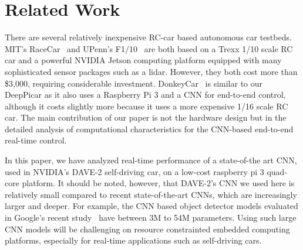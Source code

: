 \section{Related Work}\label{sec:related}


There are several relatively inexpensive RC-car based autonomous car
testbeds. MIT's RaceCar~\cite{shin2017project} and UPenn's
F1$/$10~\cite{upennf1tenth} are both based on a Trexx 1/10 scale RC
car and a powerful NVIDIA Jetson computing platform equipped with many
sophisticated sensor packages such as a lidar. However, they both cost
more than \$3,000, requiring considerable
investment. DonkeyCar~\cite{donkeycar} is similar to our DeepPicar as
it also uses a Raspberry Pi 3 and a CNN for end-to-end control,
although it costs slightly more because it uses a more expensive 1/16
scale RC car. The main contribution of our paper is not the hardware
design but in the detailed analysis of computational characteristics
for the CNN-based end-to-end real-time control.

In this paper, we have analyzed real-time performance of a
state-of-the art CNN, used in NVIDIA's DAVE-2 self-driving car, on a
low-cost raspberry pi 3 quad-core platform. It should be noted,
however, that DAVE-2's CNN we used here is relatively small compared
to recent state-of-the-art CNNs, which are increasingly larger and
deeper. For example, the CNN based object detector models evaluated in
Google's recent study~\cite{huang2017speed} have between 3M to 54M
parameters. Using such large CNN models will be challenging on
resource constrainted embedded computing platforms, especially for
real-time applications such as self-driving cars.


